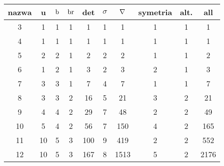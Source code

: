 
\renewcommand*{\arraystretch}{1.4}
\footnotesize
\begin{longtable}{cccccccccc}
\hline
nazwa & u & $\operatorname{b}$ & $\operatorname{br}$ & det & $\sigma$ & $\nabla$ & symetria & alt. & all \\ \hline
\endhead %
3 & 1 & 1 & 1 & 1 & 1 & 1 & 1 & 1 & 1 \\
4 & 1 & 1 & 1 & 1 & 1 & 1 & 1 & 1 & 1 \\
5 & 2 & 2 & 1 & 2 & 2 & 2 & 1 & 1 & 2 \\
6 & 1 & 2 & 1 & 3 & 2 & 3 & 2 & 1 & 3 \\
7 & 3 & 3 & 1 & 7 & 4 & 7 & 1 & 1 & 7 \\
8 & 3 & 3 & 2 & 16 & 5 & 21 & 3 & 2 & 21 \\
9 & 4 & 4 & 2 & 29 & 7 & 48 & 2 & 2 & 49 \\
10 & 5 & 4 & 2 & 56 & 7 & 150 & 4 & 2 & 165 \\
11 & 10 & 5 & 3 & 100 & 9 & 419 & 2 & 2 & 552 \\
12 & 10 & 5 & 3 & 167 & 8 & 1513 & 5 & 2 & 2176 \\
\hline
\end{longtable}
\normalsize

